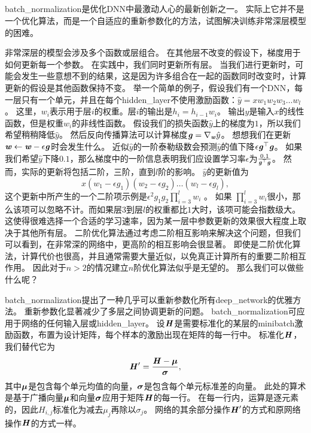 \subsection{}
\label{sec:batch_normalization}
\gls{batch_normalization}\citep{Ioffe+Szegedy-2015}是优化\gls{DNN}中最激动人心的最新创新之一。
实际上它并不是一个优化算法，而是一个自适应的重新参数化的方法，试图解决训练非常深层模型的困难。

非常深层的模型会涉及多个函数或层组合。
在其他层不改变的假设下，梯度用于如何更新每一个参数。
在实践中，我们同时更新所有层。
当我们进行更新时，可能会发生一些意想不到的结果，这是因为许多组合在一起的函数同时改变时，计算更新的假设是其他函数保持不变。
举一个简单的例子，假设我们有一个\gls{DNN}，每一层只有一个单元，并且在每个\gls{hidden_layer}不使用激励函数：$\hat{y} = xw_1 w_2 w_3 \dots w_l$。
这里，$w_i$表示用于层$i$的权重。层$i$的输出是$h_i = h_{i-1} w_i$。
输出$\hat{y}$是输入$x$的线性函数，但是权重$w_i$的非线性函数。
假设我们的损失函数$\hat{y}$上的梯度为$1$，所以我们希望稍稍降低$\hat{y}$。
然后反向传播算法可以计算梯度$\boldsymbol{\mathit{g}} = \nabla_{\boldsymbol{\mathit{w}}} \hat{y}$。
想想我们在更新$\boldsymbol{\mathit{w}} \leftarrow \boldsymbol{\mathit{w}} - \epsilon \boldsymbol{\mathit{g}}$时会发生什么。
近似$\hat{y}$的一阶泰勒级数会预测$\hat{y}$的值下降$\epsilon \boldsymbol{\mathit{g}}^\top \boldsymbol{\mathit{g}}$。
如果我们希望$\hat{y}$下降$0.1$，那么梯度中的一阶信息表明我们应设置学习率$\epsilon$为$\frac{0.1}{\boldsymbol{\mathit{g}}^\top \boldsymbol{\mathit{g}}}$。
然而，实际的更新将包括二阶，三阶，直到$l$阶的影响。
$\hat{y}$的更新值为
\begin{equation}
    x(w_1-\epsilon g_1)(w_2-\epsilon g_2)\dots(w_l-\epsilon g_l),
\end{equation}
这个更新中所产生的一个二阶项示例是$\epsilon^2 g_1 g_2 \prod_{i=3}^l w_i$ 。
如果 $\prod_{i=3}^l w_i$很小，那么该项可以忽略不计。而如果层$3$到层$l$的权重都比$1$大时，该项可能会指数级大。
这使得很难选择一个合适的学习速率，因为某一层中参数更新的效果很大程度上取决于其他所有层。
二阶优化算法通过考虑二阶相互影响来解决这个问题，但我们可以看到，在非常深的网络中，更高阶的相互影响会很显著。
即使是二阶优化算法，计算代价也很高，并且通常需要大量近似，以免真正计算所有的重要二阶相互作用。
因此对于$n>2$的情况建立$n$阶优化算法似乎是无望的。
那么我们可以做些什么呢？


\gls{batch_normalization}提出了一种几乎可以重新参数化所有\gls{deep_network}的优雅方法。
重新参数化显著减少了多层之间协调更新的问题。
\gls{batch_normalization}可应用于网络的任何输入层或\gls{hidden_layer}。
设$\boldsymbol{\mathit{H}}$是需要标准化的某层的\gls{minibatch}激励函数，布置为设计矩阵，每个样本的激励出现在矩阵的每一行中。
标准化$\boldsymbol{\mathit{H}}$，我们替代它为
\begin{equation}
\boldsymbol{\mathit{H}}' = \frac{\boldsymbol{\mathit{H}} - \boldsymbol{\mu}}{\boldsymbol{\sigma}},
\end{equation}
其中$\boldsymbol{\mu}$是包含每个单元均值的向量，$\boldsymbol{\sigma}$是包含每个单元标准差的向量。
此处的算术是基于广播向量$\boldsymbol{\mu}$和向量$\boldsymbol{\sigma}$应用于矩阵$\boldsymbol{\mathit{H}}$的每一行。
在每一行内，运算是逐元素的，因此$H_{i,j}$标准化为减去$\mu_j$再除以$\sigma_j$。
网络的其余部分操作$\boldsymbol{\mathit{H}}'$的方式和原网络操作$\boldsymbol{\mathit{H}}$的方式一样。


